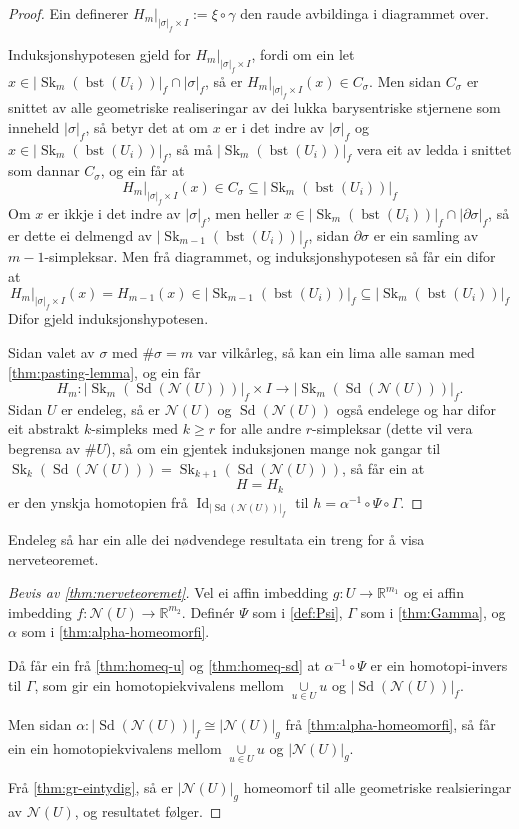 \documentclass[a4paper, 12pt, norsk]{article}
\theoremstyle{plain}
\theoremstyle{definition}
\newcommand{\Rb}{\mathbb{R}}
\newcommand{\Nc}{\mathcal{N}}
\newcommand{\intersect}{ \mathop{\cap}\limits }
\newcommand{\union}{ \mathop{\cup}\limits }
\newcommand{\gr}[1]{ \lvert #1 \rvert } %
\DeclareMathOperator{\Sd}{Sd} %
\DeclareMathOperator{\bst}{bst} %
\DeclareMathOperator{\Sk}{Sk} %
\DeclareMathOperator{\Id}{Id} %
\begin{document}
\begin{proof}
	Ein definerer \( H_m|_{\gr{\sigma}_f \times I} := \xi \circ \gamma \) den raude avbildinga i diagrammet over.

	Induksjonshypotesen gjeld for \( H_m|_{\gr{\sigma}_f \times I} \), fordi om ein let \( x \in \gr{\Sk_m(\bst(U_i))}_f \intersect \gr{\sigma}_f \), så er \( H_m|_{\gr{\sigma}_f \times I}(x) \in C_\sigma \). Men sidan \( C_\sigma \) er snittet av alle geometriske realiseringar av dei lukka barysentriske stjernene som inneheld \( \gr{\sigma}_f \), så betyr det at om \( x \) er i det indre av \( \gr{\sigma}_f \) og \( x \in \gr{\Sk_m(\bst(U_i))}_f \), så må \( \gr{\Sk_m(\bst(U_i))}_f \) vera eit av ledda i snittet som dannar \( C_\sigma \), og ein får at
	\[
		H_m|_{\gr{\sigma}_f \times I}(x) \in C_\sigma \subseteq \gr{\Sk_m(\bst(U_i))}_f
	\]
	Om \( x \) er ikkje i det indre av \( \gr{\sigma}_f \), men heller \( x \in \gr{\Sk_m(\bst(U_i))}_f \intersect \gr{\partial\sigma}_f \), så er dette ei delmengd av \( \gr{\Sk_{m-1}(\bst(U_i))}_f \), sidan \( \partial\sigma \) er ein samling av \( m-1 \)-simpleksar. Men frå diagrammet, og induksjonshypotesen så får ein difor at
	\[
		H_m|_{\gr{\sigma}_f \times I}(x) = H_{m-1}(x) \in \gr{\Sk_{m-1}(\bst(U_i))}_f \subseteq \gr{\Sk_{m}(\bst(U_i))}_f
	\]
	Difor gjeld induksjonshypotesen.

	Sidan valet av \( \sigma \) med \( \#\sigma = m \) var vilkårleg, så kan ein lima alle saman med \autoref{thm:pasting-lemma}, og ein får
	\[
		H_m : \gr{\Sk_m(\Sd(\Nc(U)))}_f \times I \to \gr{\Sk_m(\Sd(\Nc(U)))}_f.
	\]
	Sidan \( U \) er endeleg, så er \( \Nc(U) \) og \( \Sd(\Nc(U)) \) også endelege og har difor eit abstrakt \( k \)-simpleks med \( k \geq r \) for alle andre \( r \)-simpleksar (dette vil vera begrensa av \( \#U \)), så om ein gjentek induksjonen mange nok gangar til \( \Sk_{k}(\Sd(\Nc(U))) = \Sk_{k+1}(\Sd(\Nc(U))) \), så får ein at
	\[
		H = H_k
	\]
	er den ynskja homotopien frå \( \Id_{\gr{\Sd(\Nc(U))}_f} \) til \( h = \alpha^{-1} \circ \Psi \circ \Gamma \).
\end{proof}

Endeleg så har ein alle dei nødvendege resultata ein treng for å visa nerveteoremet.

\begin{proof}[Bevis av \autoref{thm:nerveteoremet}]
	Vel ei affin imbedding \( g: U \to \Rb^{m_1} \) og ei affin imbedding \( f: \Nc(U) \to \Rb^{m_2} \). Definér \( \Psi \) som i \autoref{def:Psi}, \( \Gamma \) som i \autoref{thm:Gamma}, og \( \alpha \) som i \autoref{thm:alpha-homeomorfi}.

	Då får ein frå \autoref{thm:homeq-u} og \autoref{thm:homeq-sd} at \( \alpha^{-1} \circ \Psi \) er ein homotopi-invers til \( \Gamma \), som gir ein homotopiekvivalens mellom \( \union_{u \in U} u \) og \( \gr{\Sd(\Nc(U))}_f \).

	Men sidan \( \alpha : \gr{\Sd(\Nc(U))}_f \cong \gr{\Nc(U)}_g \) frå \autoref{thm:alpha-homeomorfi}, så får ein ein homotopiekvivalens mellom \( \union_{u \in U} u \) og \( \gr{\Nc(U)}_g \).

	Frå \autoref{thm:gr-eintydig}, så er \( \gr{\Nc(U)}_g \) homeomorf til alle geometriske realsieringar av \( \Nc(U) \), og resultatet følger.
\end{proof}
\end{document}
